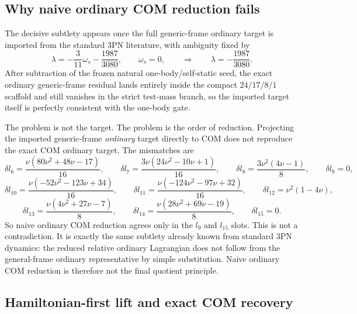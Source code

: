 \documentclass[11pt]{article}
\begin{document}
\subsection{Why naive ordinary COM reduction fails}
\label{sec:compmass-naive-com}

The decisive subtlety appears once the full generic-frame ordinary target is
imported from the standard $3$PN literature, with ambiguity fixed by
\[
\lambda=-\frac{3}{11}\omega_s-\frac{1987}{3080},
\qquad
\omega_s=0,
\qquad
\Rightarrow
\qquad
\lambda=-\frac{1987}{3080}.
\]
After subtraction of the frozen natural one-body/self-static seed, the exact
ordinary generic-frame residual lands entirely inside the compact $24/17/8/1$
scaffold and still vanishes in the strict test-mass branch, so the imported
target itself is perfectly consistent with the one-body gate.

The problem is not the target.  The problem is the order of reduction.
Projecting the imported generic-frame \emph{ordinary} target directly to COM does
not reproduce the exact COM ordinary target.  The mismatches are
\[
\delta l_6=\frac{\nu(80\nu^2+48\nu-17)}{16},
\qquad
\delta l_7=\frac{3\nu(24\nu^2-10\nu+1)}{16},
\qquad
\delta l_8=\frac{3\nu^2(4\nu-1)}{8},
\qquad
\delta l_9=0,
\]
\[
\delta l_{10}=\frac{\nu(-52\nu^2-123\nu+34)}{16},
\qquad
\delta l_{11}=\frac{\nu(-124\nu^2-97\nu+32)}{16},
\qquad
\delta l_{12}=\nu^2(1-4\nu),
\]
\[
\delta l_{13}=\frac{\nu(4\nu^2+27\nu-7)}{8},
\qquad
\delta l_{14}=\frac{\nu(28\nu^2+69\nu-19)}{8},
\qquad
\delta l_{15}=0.
\]
So naive ordinary COM reduction agrees only in the $l_9$ and $l_{15}$ slots.
This is not a contradiction.  It is exactly the same subtlety already known from
standard $3$PN dynamics: the reduced relative ordinary Lagrangian does not
follow from the general-frame ordinary representative by simple substitution.
Naive ordinary COM reduction is therefore not the final quotient principle.

\subsection{Hamiltonian-first lift and exact COM recovery}
\label{sec:compmass-hamiltonian-first}
\end{document}
